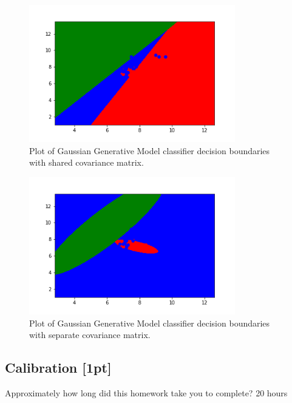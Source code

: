 \documentclass[submit]{harvardml}
\begin{document}
\begin{figure}[h]
\centering
\includegraphics[width=0.8\textwidth]{generative_result_shared_covariances}
\caption{Plot of Gaussian Generative Model classifier decision boundaries with shared covariance matrix.}
\label{fig:1.5}
\end{figure}

\begin{figure}[h]
\centering
\includegraphics[width=0.8\textwidth]{generative_result_separate_covariances}
\caption{Plot of Gaussian Generative Model classifier decision boundaries with separate covariance matrix.}
\label{fig:1.6}
\end{figure}



\newpage
\subsection*{Calibration [1pt]}
Approximately how long did this homework take you to complete?
20 hours
\end{document}
